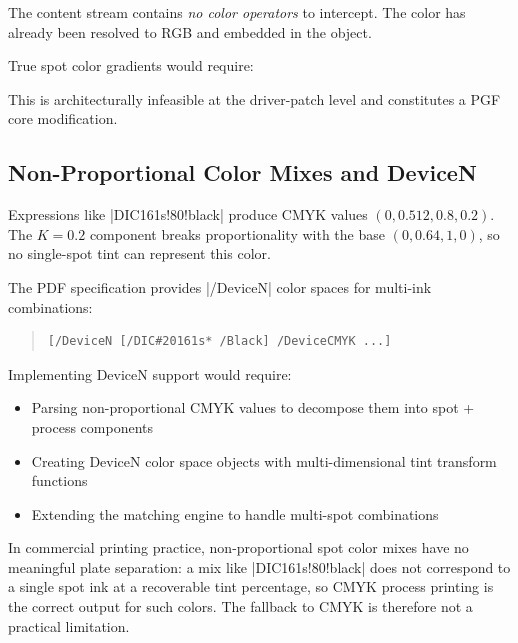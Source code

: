 \documentclass[luatex]{article}
\begin{document}
The content stream contains \emph{no color operators} to intercept.
The color has already been resolved to RGB and embedded in the object.

True spot color gradients would require:

This is architecturally infeasible at the driver-patch level and constitutes a PGF core modification.

\subsection{Non-Proportional Color Mixes and DeviceN}

Expressions like |DIC161s!80!black| produce CMYK values $(0, 0.512, 0.8, 0.2)$.
The $K=0.2$ component breaks proportionality with the base $(0, 0.64, 1, 0)$, so no single-spot tint can represent this color.

The PDF specification provides |/DeviceN| color spaces for multi-ink combinations:
\begin{quote}
\begin{verbatim}
[/DeviceN [/DIC#20161s* /Black] /DeviceCMYK ...]
\end{verbatim}
\end{quote}

Implementing DeviceN support would require:
\begin{itemize}
\item Parsing non-proportional CMYK values to decompose them into spot + process components
\item Creating DeviceN color space objects with multi-dimensional tint transform functions
\item Extending the matching engine to handle multi-spot combinations
\end{itemize}

In commercial printing practice, non-proportional spot color mixes
have no meaningful plate separation:
a mix like |DIC161s!80!black| does not correspond to
a single spot ink at a recoverable tint percentage,
so CMYK process printing is the correct output for such colors.
The fallback to CMYK is therefore not a practical limitation.
\end{document}

